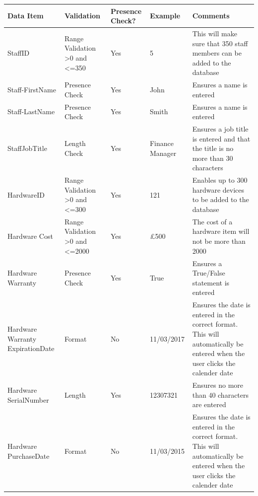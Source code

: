 \begin{center}
    \begin{longtable}{|p{2.5cm}|p{2cm}|p{3cm}|p{3cm}|p{3cm}|}
        \hline
        \textbf{Data Item} & \textbf{Validation} & \textbf{Presence Check?} & \textbf{Example} & \textbf{Comments} \\ \hline
StaffID                              & Range Validation \textgreater0 and \textless=350        &  Yes & 5        & This will make sure that 350 staff members can be added to the database   \\ \hline
Staff-FirstName                      & Presence Check                   & Yes        & John                  &  Ensures a name is entered                      \\ \hline
Staff-LastName                       & Presence Check               & Yes            & Smith                 &   Ensures a name is entered                     \\ \hline
StaffJobTitle			&   Length Check 			&Yes & Finance Manager		&Ensures a job title is entered and that the title is no more than 30 characters		\\ \hline
HardwareID                         &   Range Validation \textgreater0 and  \textless=300      &Yes                & 121                   & Enables up to 300 hardware devices to be added to the database \\ \hline
Hardware Cost                     &   Range Validation \textgreater0 and \textless=2000            &Yes                        & £500                  &  The cost of a hardware item will not be more than 2000                     \\ \hline
Hardware Warranty                    & Presence Check            &Yes               & True                  & Ensures a True/False statement is entered                      \\ \hline
Hardware Warranty ExpirationDate           & Format                      &No             & 11/03/2017               &   Ensures the date is entered in the correct format. This will automatically be entered when the user clicks the calender date                    \\ \hline
Hardware SerialNumber              & Length                 &Yes                  & 12307321              &      Ensures no more than 40 characters are entered                 \\ \hline
Hardware PurchaseDate               & Format                 &No                  & 11/03/2015              & Ensures the date is entered in the correct format. This will automatically be entered when the user clicks the calender date                       \\ \hline

\end{longtable}
\end{center}
